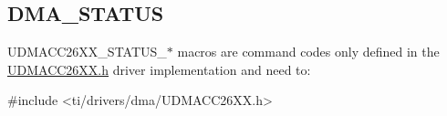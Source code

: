 \subsection{D\+M\+A\+\_\+\+S\+T\+A\+T\+U\+S}
\label{group___d_m_a___s_t_a_t_u_s}
U\+D\+M\+A\+C\+C26\+X\+X\+\_\+\+S\+T\+A\+T\+U\+S\+\_\+$\ast$ macros are command codes only defined in the \hyperlink{_u_d_m_a_c_c26_x_x_8h}{U\+D\+M\+A\+C\+C26\+X\+X.\+h} driver implementation and need to\+: 
\begin{DoxyCode}
\textcolor{preprocessor}{#include <ti/drivers/dma/UDMACC26XX.h>}
\end{DoxyCode}
 